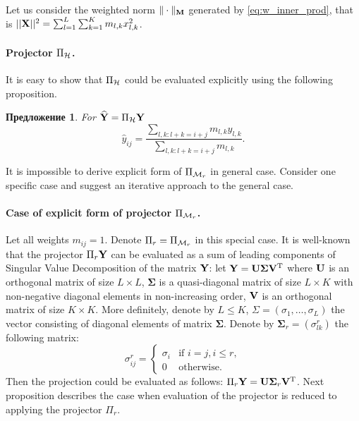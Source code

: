 \documentclass[12pt,a4paper,fleqn,leqno]{article}
\newtheorem{proposition}{Предложение}
\begin{document}
Let us consider the weighted norm $\|\cdot\|_{\mathbf{M}}$ generated by \eqref{eq:w_inner_prod}, that is $||\mathbf{X}||^2 = \sum_{l = 1}^L \sum_{k = 1}^K m_{l, k} x^2_{l, k}$.

\paragraph{Projector $\Pi_{\mathcal{H}}$.} It is easy to show that $\Pi_{\mathcal{H}}$
could be evaluated explicitly using the following proposition.

\begin{proposition}
For $\widehat{\mathbf{Y}}=\Pi_{\mathcal{H}} \mathbf{Y}$
\begin{equation*}
\hat{y}_{ij} = \frac{\sum_{l,k: l+k=i+j} m_{l,k} y_{l,k}}{\sum_{l,k: l+k=i+j} m_{l,k}}.
\end{equation*}
\end{proposition}

It is impossible to derive explicit form of $\Pi_{\mathcal{M}_r}$ in general case.
Consider one specific case and suggest an iterative approach to the general case.

\paragraph{Case of explicit form of projector $\Pi_{\mathcal{M}_r}$.} 
Let all weights $m_{ij}=1$. Denote $\Pi_r=\Pi_{\mathcal{M}_r}$ in this special case.
It is well-known that the projector $\Pi_{r} \mathbf{Y}$ can be evaluated as a sum of leading components of Singular Value Decomposition of the matrix $\mathbf{Y}$: let $\mathbf{Y} = \mathbf{U} \mathbf{\Sigma} \mathbf{V}^{\mathrm{T}}$ where $\mathbf{U}$ is an orthogonal matrix of size $L \times L$, $\mathbf{\Sigma}$ is a quasi-diagonal matrix of size $L \times K$ with non-negative diagonal elements in non-increasing order, $\mathbf{V}$ is an orthogonal matrix of size $K \times K$. More definitely, denote by $L\le K$, $\Sigma = (\sigma_1, \ldots, \sigma_L)$ the vector consisting of diagonal elements of matrix $\mathbf{\Sigma}$. Denote by $\mathbf{\Sigma}_r = (\sigma^r_{l k})$ the following matrix:
\begin{equation*}
\sigma^r_{i j} = \begin{cases}
\sigma_i & \text{if $i = j, i \le r,$}\\
0 & \text{otherwise}.
\end{cases}
\end{equation*}
Then the projection could be evaluated as follows: $\Pi_{r} \mathbf{Y}  = \mathbf{U} \mathbf{\Sigma}_r \mathbf{V}^{\mathrm{T}}$.
Next proposition describes the case when evaluation of the projector is reduced to applying the projector  $\Pi_r$.
\end{document}
